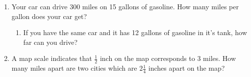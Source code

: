 \documentclass{article}
\begin{document}
\begin{enumerate}
\vfill

\item Your car can drive 300 miles on 15 gallons of gasoline. How many miles
per gallon does your car get? 

\vspace{1in}

\begin{enumerate}
\item If you have the same car and it has 12 gallons of gasoline in it's tank,
how far can you drive?
\end{enumerate}

\vfill

\item A map scale indicates that $\frac{1}{2}$ inch on the map corresponds to 3
miles. How many miles apart are two cities which are $2\frac{1}{4}$ inches apart
on the map? 

\vfill 
\end{enumerate}
\end{document}
